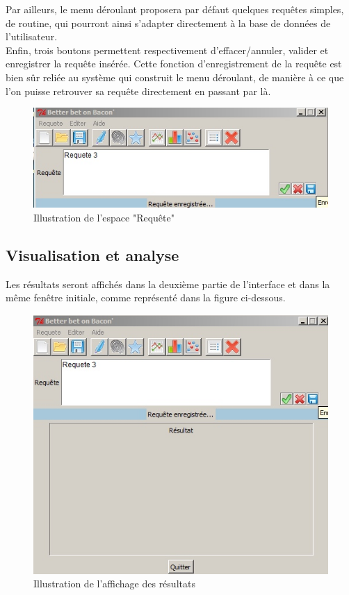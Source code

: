 \documentclass[a4paper,10pt]{report}
\begin{document}
Par ailleurs, le menu déroulant proposera par défaut quelques requêtes simples, de routine, qui pourront ainsi s’adapter directement à la base de données de l’utilisateur.\\

Enfin, trois boutons permettent respectivement d’effacer/annuler, valider et enregistrer la requête insérée. Cette fonction d’enregistrement de la requête est bien sûr reliée au système qui construit le menu déroulant, de manière à ce que l’on puisse retrouver sa requête directement en passant par là.


\begin{figure}[H]

\centering
\includegraphics[scale=0.6]{requ.jpg}
\caption{Illustration de l'espace "Requête"}

\end{figure}


\subsection{Visualisation et analyse}

Les résultats seront affichés dans la deuxième partie de l'interface et dans la même fenêtre initiale, comme représenté dans la figure ci-dessous.


\begin{figure}[H]

\centering
\includegraphics[scale=0.6]{res.jpg}
\caption{Illustration de l'affichage des résultats}

\end{figure}
\end{document}
